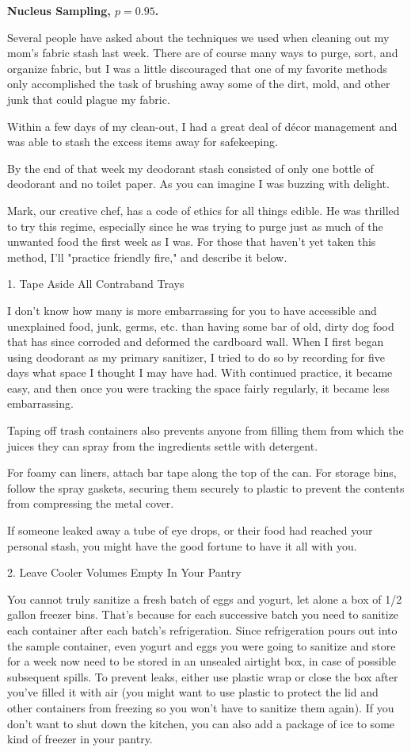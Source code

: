 \documentclass{article}
\newcommand{\myparagraph}[1]{\par\noindent\textbf{{#1}.}} %
\theoremstyle{definition}
\begin{document}
\myparagraph{Nucleus Sampling, $p=0.95$}
\begin{displayquote}
{\small
Several people have asked about the techniques we used when cleaning out my mom's fabric stash last week. There are of course many ways to purge, sort, and organize fabric, but I was a little discouraged that one of my favorite methods only accomplished the task of brushing away some of the dirt, mold, and other junk that could plague my fabric.

Within a few days of my clean-out, I had a great deal of d\'ecor management and was able to stash the excess items away for safekeeping.

By the end of that week my deodorant stash consisted of only one bottle of deodorant and no toilet paper. As you can imagine I was buzzing with delight.

Mark, our creative chef, has a code of ethics for all things edible. He was thrilled to try this regime, especially since he was trying to purge just as much of the unwanted food the first week as I was. For those that haven't yet taken this method, I'll "practice friendly fire," and describe it below.

1. Tape Aside All Contraband Trays

I don't know how many is more embarrassing for you to have accessible and unexplained food, junk, germs, etc. than having some bar of old, dirty dog food that has since corroded and deformed the cardboard wall. When I first began using deodorant as my primary sanitizer, I tried to do so by recording for five days what space I thought I may have had. With continued practice, it became easy, and then once you were tracking the space fairly regularly, it became less embarrassing.

Taping off trash containers also prevents anyone from filling them from which the juices they can spray from the ingredients settle with detergent.

For foamy can liners, attach bar tape along the top of the can. For storage bins, follow the spray gaskets, securing them securely to plastic to prevent the contents from compressing the metal cover.

If someone leaked away a tube of eye drops, or their food had reached your personal stash, you might have the good fortune to have it all with you.

2. Leave Cooler Volumes Empty In Your Pantry

You cannot truly sanitize a fresh batch of eggs and yogurt, let alone a box of 1/2 gallon freezer bins. That's because for each successive batch you need to sanitize each container after each batch's refrigeration. Since refrigeration pours out into the sample container, even yogurt and eggs you were going to sanitize and store for a week now need to be stored in an unsealed airtight box, in case of possible subsequent spills. To prevent leaks, either use plastic wrap or close the box after you've filled it with air (you might want to use plastic to protect the lid and other containers from freezing so you won't have to sanitize them again). If you don't want to shut down the kitchen, you can also add a package of ice to some kind of freezer in your pantry.

}
\end{displayquote}
\end{document}
